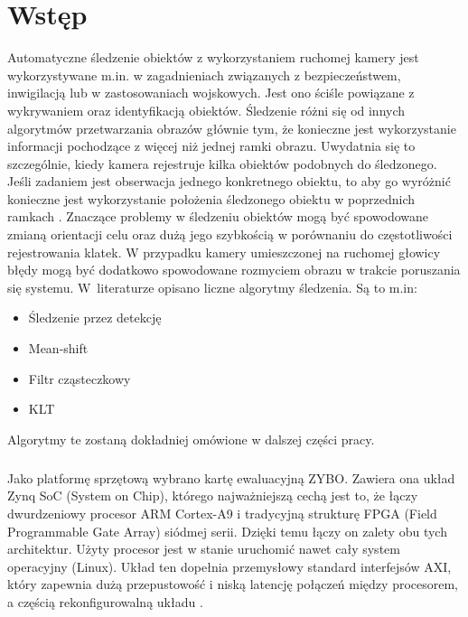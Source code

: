 \chapter{Wstęp}
\label{cha:wstep}



Automatyczne śledzenie obiektów z wykorzystaniem ruchomej kamery jest wykorzystywane m.in. w zagadnieniach związanych z bezpieczeństwem, inwigilacją lub w zastosowaniach wojskowych.
Jest ono ściśle powiązane z wykrywaniem oraz identyfikacją obiektów.
Śledzenie różni się od innych algorytmów przetwarzania obrazów głównie tym, że konieczne jest wykorzystanie informacji pochodzące z więcej niż jednej ramki obrazu.
Uwydatnia się to szczególnie, kiedy kamera rejestruje kilka obiektów podobnych do śledzonego. 
Jeśli zadaniem jest obserwacja jednego konkretnego obiektu, to aby go wyróżnić konieczne jest wykorzystanie położenia śledzonego obiektu w poprzednich ramkach \cite{VT}.
Znaczące problemy w śledzeniu obiektów mogą być spowodowane zmianą orientacji celu oraz dużą jego szybkością w porównaniu do częstotliwości rejestrowania klatek.
W przypadku kamery umieszczonej na ruchomej głowicy błędy mogą być dodatkowo spowodowane rozmyciem obrazu w trakcie poruszania się systemu.
W~literaturze opisano liczne algorytmy śledzenia. Są to m.in:
\begin{itemize}
\item{Śledzenie przez detekcję}
\item{Mean-shift}
\item{Filtr cząsteczkowy}
\item{KLT}
\end{itemize}
Algorytmy te zostaną dokładniej omówione w dalszej części pracy.

\paragraph*{}
Jako platformę sprzętową wybrano kartę ewaluacyjną ZYBO. Zawiera ona układ Zynq SoC (System on Chip), którego najważniejszą cechą jest to, że łączy dwurdzeniowy procesor ARM Cortex-A9 i tradycyjną strukturę FPGA (Field Programmable Gate Array) siódmej serii. Dzięki temu łączy on zalety obu tych architektur. Użyty procesor jest w stanie uruchomić nawet cały system operacyjny (Linux). Układ ten dopełnia przemysłowy standard interfejsów AXI, który zapewnia dużą przepustowość i niską latencję połączeń między procesorem, a częścią rekonfigurowalną układu \cite{Zynq}.

